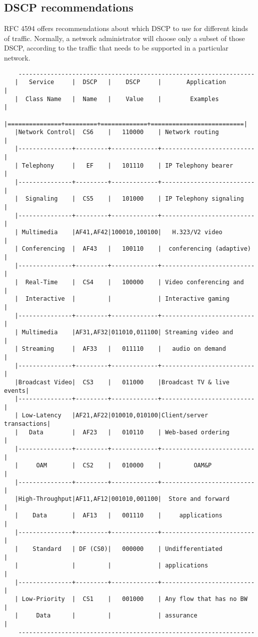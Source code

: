 \subsection{DSCP recommendations}

RFC 4594 \cite{rfc4594} offers recommendations about which DSCP to use for different kinds of traffic.
Normally, a network administrator will choose only a subset of those DSCP, according to the traffic that needs to be supported in a particular network.

{\scriptsize
\begin{verbatim}
    ------------------------------------------------------------------
   |   Service     |  DSCP   |    DSCP     |       Application        |
   |  Class Name   |  Name   |    Value    |        Examples          |
   |===============+=========+=============+==========================|
   |Network Control|  CS6    |   110000    | Network routing          |
   |---------------+---------+-------------+--------------------------|
   | Telephony     |   EF    |   101110    | IP Telephony bearer      |
   |---------------+---------+-------------+--------------------------|
   |  Signaling    |  CS5    |   101000    | IP Telephony signaling   |
   |---------------+---------+-------------+--------------------------|
   | Multimedia    |AF41,AF42|100010,100100|   H.323/V2 video         |
   | Conferencing  |  AF43   |   100110    |  conferencing (adaptive) |
   |---------------+---------+-------------+--------------------------|
   |  Real-Time    |  CS4    |   100000    | Video conferencing and   |
   |  Interactive  |         |             | Interactive gaming       |
   |---------------+---------+-------------+--------------------------|
   | Multimedia    |AF31,AF32|011010,011100| Streaming video and      |
   | Streaming     |  AF33   |   011110    |   audio on demand        |
   |---------------+---------+-------------+--------------------------|
   |Broadcast Video|  CS3    |   011000    |Broadcast TV & live events|
   |---------------+---------+-------------+--------------------------|
   | Low-Latency   |AF21,AF22|010010,010100|Client/server transactions|
   |   Data        |  AF23   |   010110    | Web-based ordering       |
   |---------------+---------+-------------+--------------------------|
   |     OAM       |  CS2    |   010000    |         OAM&P            |
   |---------------+---------+-------------+--------------------------|
   |High-Throughput|AF11,AF12|001010,001100|  Store and forward       |
   |    Data       |  AF13   |   001110    |     applications         |
   |---------------+---------+-------------+--------------------------|
   |    Standard   | DF (CS0)|   000000    | Undifferentiated         |
   |               |         |             | applications             |
   |---------------+---------+-------------+--------------------------|
   | Low-Priority  |  CS1    |   001000    | Any flow that has no BW  |
   |     Data      |         |             | assurance                |
    ------------------------------------------------------------------
\end{verbatim}
}

